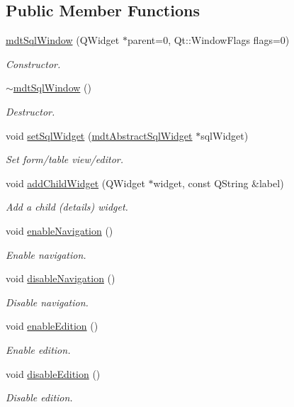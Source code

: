 \subsection*{Public Member Functions}
\begin{DoxyCompactItemize}
\item 
\hyperlink{classmdt_sql_window_a8624cc7a7a454e759c753c2faddd46e6}{mdtSqlWindow} (QWidget $\ast$parent=0, Qt::WindowFlags flags=0)
\begin{DoxyCompactList}\small\item\em Constructor. \end{DoxyCompactList}\item 
\hypertarget{classmdt_sql_window_a050588d255a48722438421b754b808f3}{
\hyperlink{classmdt_sql_window_a050588d255a48722438421b754b808f3}{$\sim$mdtSqlWindow} ()}
\label{classmdt_sql_window_a050588d255a48722438421b754b808f3}

\begin{DoxyCompactList}\small\item\em Destructor. \end{DoxyCompactList}\item 
void \hyperlink{classmdt_sql_window_ac9246abfa0ccb7c721ee233d5928230d}{setSqlWidget} (\hyperlink{classmdt_abstract_sql_widget}{mdtAbstractSqlWidget} $\ast$sqlWidget)
\begin{DoxyCompactList}\small\item\em Set form/table view/editor. \end{DoxyCompactList}\item 
void \hyperlink{classmdt_sql_window_aa2e3c5e6cd07caf71f957b2d50775b6c}{addChildWidget} (QWidget $\ast$widget, const QString \&label)
\begin{DoxyCompactList}\small\item\em Add a child (details) widget. \end{DoxyCompactList}\item 
void \hyperlink{classmdt_sql_window_a6d4d853c8c64a99ff2e396b99ea63a87}{enableNavigation} ()
\begin{DoxyCompactList}\small\item\em Enable navigation. \end{DoxyCompactList}\item 
void \hyperlink{classmdt_sql_window_a961d587d63b0997a10db6728773a108f}{disableNavigation} ()
\begin{DoxyCompactList}\small\item\em Disable navigation. \end{DoxyCompactList}\item 
void \hyperlink{classmdt_sql_window_a42d1283a05eddd2a48af74cf764ef240}{enableEdition} ()
\begin{DoxyCompactList}\small\item\em Enable edition. \end{DoxyCompactList}\item 
void \hyperlink{classmdt_sql_window_a629fa57fcdde0e4db0fc93efd84c9123}{disableEdition} ()
\begin{DoxyCompactList}\small\item\em Disable edition. \end{DoxyCompactList}\end{DoxyCompactItemize}


